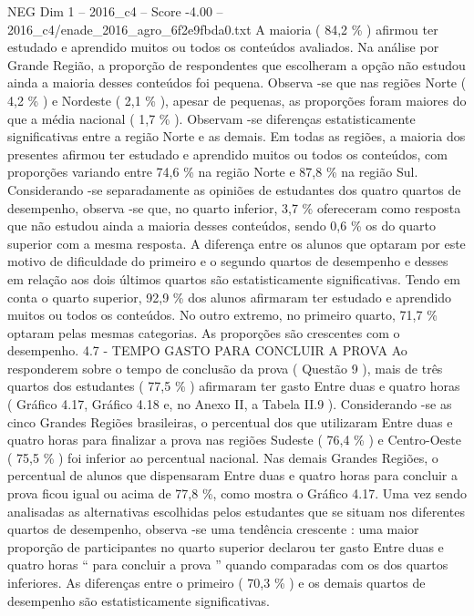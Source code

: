 \begin{textsample}{NEG Dim 1 – 2016\_c4 – Score -4.00 – 2016\_c4/enade\_2016\_agro\_6f2e9fbda0.txt}
A maioria ( 84,2 \% ) afirmou ter estudado e aprendido muitos ou todos os conteúdos avaliados.
Na análise por Grande Região, a proporção de respondentes que escolheram a opção não estudou ainda a maioria desses conteúdos foi pequena.
Observa -se que nas regiões Norte ( 4,2 \% ) e Nordeste ( 2,1 \% ), apesar de pequenas, as proporções foram maiores do que a média nacional ( 1,7 \% ).
Observam -se diferenças estatisticamente significativas entre a região Norte e as demais.
Em todas as regiões, a maioria dos presentes afirmou ter estudado e aprendido muitos ou todos os conteúdos, com proporções variando entre 74,6 \% na região Norte e 87,8 \% na região Sul.
Considerando -se separadamente as opiniões de estudantes dos quatro quartos de desempenho, observa -se que, no quarto inferior, 3,7 \% ofereceram como resposta que não estudou ainda a maioria desses conteúdos, sendo 0,6 \% os do quarto superior com a mesma resposta.
A diferença entre os alunos que optaram por este motivo de dificuldade do primeiro e o segundo quartos de desempenho e desses em relação aos dois últimos quartos são estatisticamente significativas.
Tendo em conta o quarto superior, 92,9 \% dos alunos afirmaram ter estudado e aprendido muitos ou todos os conteúdos.
No outro extremo, no primeiro quarto, 71,7 \% optaram pelas mesmas categorias.
As proporções são crescentes com o desempenho. 4.7 - TEMPO GASTO PARA CONCLUIR A PROVA Ao responderem sobre o tempo de conclusão da prova ( Questão 9 ), mais de três quartos dos estudantes ( 77,5 \% ) afirmaram ter gasto Entre duas e quatro horas ( Gráfico 4.17, Gráfico 4.18 e, no Anexo II, a Tabela II.9 ).
Considerando -se as cinco Grandes Regiões brasileiras, o percentual dos que utilizaram Entre duas e quatro horas para finalizar a prova nas regiões Sudeste ( 76,4 \% ) e Centro-Oeste ( 75,5 \% ) foi inferior ao percentual nacional.
Nas demais Grandes Regiões, o percentual de alunos que dispensaram Entre duas e quatro horas para concluir a prova ficou igual ou acima de 77,8 \%, como mostra o Gráfico 4.17.
Uma vez sendo analisadas as alternativas escolhidas pelos estudantes que se situam nos diferentes quartos de desempenho, observa -se uma tendência crescente : uma maior proporção de participantes no quarto superior declarou ter gasto Entre duas e quatro horas “ para concluir a prova ” quando comparadas com os dos quartos inferiores.
As diferenças entre o primeiro ( 70,3 \% ) e os demais quartos de desempenho são estatisticamente significativas.

\end{textsample}

